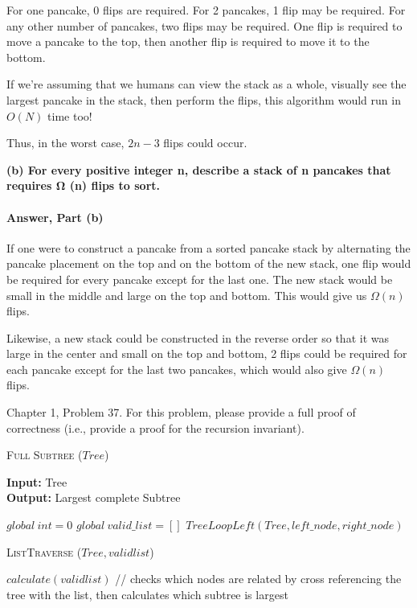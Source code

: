 \documentclass{article}
\begin{document}
For one pancake, 0 flips are required. For 2 pancakes, 1 flip may be required. For any other number of pancakes,
two flips may be required. One flip is required to move a pancake to the top, then another flip is required to
move it to the bottom.

If we're assuming that we humans can view the stack as a whole, visually see the largest pancake in the stack,
then perform the flips, this algorithm would run in $O (N)$ time too!

Thus, in the worst case, $2n - 3$ flips could occur.

{\bf (b) For every positive integer n, describe a stack of n pancakes that requires
Ω (n) flips to sort.}

\paragraph{Answer, Part (b)}

If one were to construct a pancake from a sorted pancake stack by alternating the pancake placement on the
top and on the bottom of the new stack, one flip would be required for every pancake except for the last one.
The new stack would be small in the middle and large on the top and bottom. This would give us $\Omega(n)$ flips.

Likewise, a new stack could be constructed in the reverse order so that it was large in the center and small on
the top and bottom, 2 flips could be required for each pancake except for the last two pancakes, which would
also give $\Omega(n)$ flips.


Chapter 1, Problem 37.  For this problem, please provide a full proof of
correctness (i.e., provide a proof for the recursion invariant).

\begin{algorithm} \caption{\textsc{Full Subtree} ($Tree$)}\label{alg:seb}
    {\bf Input:} Tree\\
    {\bf Output:} Largest complete Subtree
    \begin{algorithmic}[1]
		\State$global\ int=0$
		\State$global\ valid\_list=[]$
        \State$TreeLoopLeft(Tree, left\_node, right\_node)$
    \end{algorithmic}
\end{algorithm}

\begin{algorithm} \caption{\textsc{ListTraverse} ($Tree, validlist$)}\label{alg:seb}
    \begin{algorithmic}[1]
        \State$calculate(validlist)$ // checks which nodes are related by cross referencing the tree with the list, then calculates which subtree is largest
    \end{algorithmic}
\end{algorithm}
\end{document}

